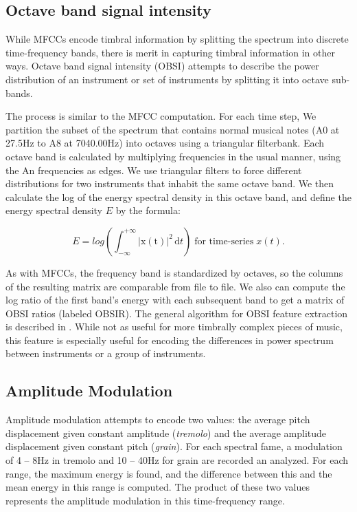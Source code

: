 \documentclass[12pt,twocolumn,titlepage]{article}
\begin{document}
\subsection{Octave band signal intensity}

While MFCCs encode timbral information by splitting the spectrum into discrete time-frequency bands, there is merit in capturing timbral information in other ways. Octave band signal intensity (OBSI) attempts to describe the power distribution of an instrument or set of instruments by splitting it into octave sub-bands. 


The process is similar to the MFCC computation. For each time step, We partition the subset of the spectrum that contains normal musical notes (A0 at 27.5Hz to A8 at 7040.00Hz) into octaves using a triangular filterbank. Each octave band is calculated by multiplying frequencies in the usual manner, using the An frequencies as edges. We use triangular filters to force different distributions for two instruments that inhabit the same octave band. We then calculate the log of the energy spectral density in this octave band, and define the energy spectral density $E$
 by the formula: \cite{Oppenheim}

\begin{equation}\label{}
E = log\left(\int_{-\infty}^{+\infty} \mathrm{|x(t)|}^2\, \mathrm{d}t\right) \; \text{for time-series} \; x(t).
\end{equation}

As with MFCCs, the frequency band is standardized by octaves, so the columns of the resulting matrix are comparable from file to file. We also can compute the log ratio of the first band's energy with each subsequent band to get a matrix of OBSI ratios (labeled OBSIR). The general algorithm for OBSI feature extraction is described in \cite{Essid}. While not as useful for more timbrally complex pieces of music, this feature is especially useful for encoding the differences in power spectrum between instruments or a group of instruments. 

\subsection{Amplitude Modulation}

Amplitude modulation attempts to encode two values: the average pitch displacement given constant amplitude (\emph{tremolo}) and the average amplitude displacement given constant pitch (\emph{grain}). \cite{Eronen} For each spectral fame, a modulation of 4 -- 8Hz in tremolo and 10 -- 40Hz for grain are recorded an analyzed. For  each range, the maximum energy is found, and the difference between this and the mean energy in this range is computed. \cite{yaafe} The product of these two values represents the amplitude modulation in this time-frequency range.
\end{document}
